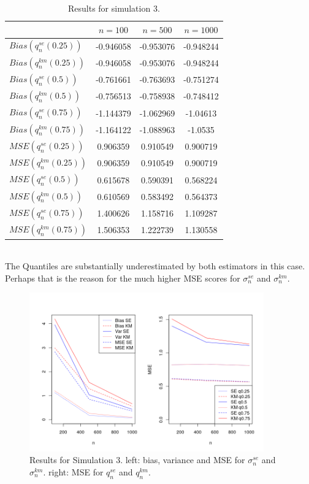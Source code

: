 \begin{table}[h!]
	\begin{center}
		
		\begin{tabular}{| l || c | c | c |}	
			\hline
			& $ n = 100 $ & $ n = 500 $ & $ n = 1000 $\\
			\hline
			\hline
			$Bias(q^{se}_n(0.25)) $ & -0.946058 & -0.953076 & -0.948244\\
			$Bias(q^{km}_n(0.25)) $ & -0.946058 & -0.953076 & -0.948244\\
			\hline
			$Bias(q^{se}_n(0.5)) $ & -0.761661 & -0.763693 & -0.751274\\
			$Bias(q^{km}_n(0.5))$ & -0.756513 & -0.758938 & -0.748412\\
			\hline
			$Bias(q^{se}_n(0.75))$ & -1.144379 & -1.062969 & -1.04613\\
			$Bias(q^{km}_n(0.75))$ & -1.164122 & -1.088963 & -1.0535\\
			\hline
			\hline
			$MSE(q^{se}_n(0.25))$ & 0.906359 & 0.910549 & 0.900719\\
			$MSE(q^{km}_n(0.25))$ & 0.906359 & 0.910549 & 0.900719\\
			\hline
			$MSE(q^{se}_n(0.5))$ & 0.615678 & 0.590391 & 0.568224\\
			$MSE(q^{km}_n(0.5))$ & 0.610569 & 0.583492 & 0.564373\\
			\hline
			$MSE(q^{se}_n(0.75))$ & 1.400626 & 1.158716 & 1.109287\\
			$MSE(q^{km}_n(0.75))$ & 1.506353 & 1.222739 & 1.130558\\
			\hline
		\end{tabular}
	\end{center}
	\caption{Results for simulation 3.}
	\label{tab:res_exppar2}
\end{table}\\
%
The Quantiles are substantially underestimated by both estimators in this case. Perhaps that is the reason for the much higher MSE scores for $\sigma_n^{se}$ and $\sigma_n^{km}$.
\begin{figure}[h!]
	\begin{center}
		\includegraphics[width=0.9\textwidth]{./figures/exppar_mse2}
	\end{center}
	\caption{Results for Simulation 3. left: bias, variance and MSE for $\sigma_n^{se}$ and $\sigma_n^{km}$. right: MSE for $q_n^{se}$ and $q_n^{km}$.}
	\label{fig:mse_exppar}
\end{figure}